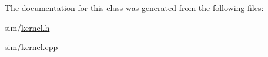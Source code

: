 The documentation for this class was generated from the following files\+:\begin{DoxyCompactItemize}
\item 
sim/\hyperlink{kernel_8h}{kernel.\+h}\item 
sim/\hyperlink{kernel_8cpp}{kernel.\+cpp}\end{DoxyCompactItemize}
